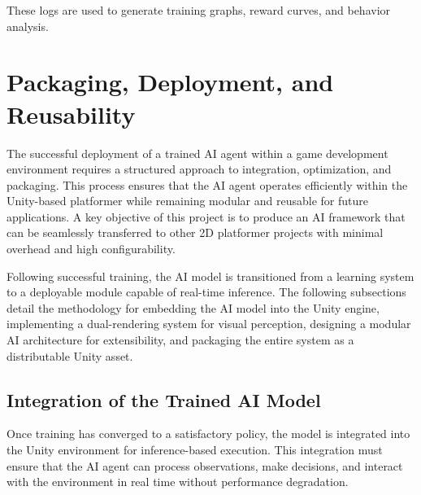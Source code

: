 \documentclass[12pt,oneside,openright,a4paper]{cpe-english-project}
\begin{document}
These logs are used to generate training graphs, reward curves, and behavior analysis.

\section{Packaging, Deployment, and Reusability}
The successful deployment of a trained AI agent within a game development environment requires a structured approach to integration, optimization, and packaging. This process ensures that the AI agent operates efficiently within the Unity-based platformer while remaining modular and reusable for future applications. A key objective of this project is to produce an AI framework that can be seamlessly transferred to other 2D platformer projects with minimal overhead and high configurability.\par

Following successful training, the AI model is transitioned from a learning system to a deployable module capable of real-time inference. The following subsections detail the methodology for embedding the AI model into the Unity engine, implementing a dual-rendering system for visual perception, designing a modular AI architecture for extensibility, and packaging the entire system as a distributable Unity asset.\par
\subsection{Integration of the Trained AI Model}
Once training has converged to a satisfactory policy, the model is integrated into the Unity environment for inference-based execution. This integration must ensure that the AI agent can process observations, make decisions, and interact with the environment in real time without performance degradation.
\end{document}
